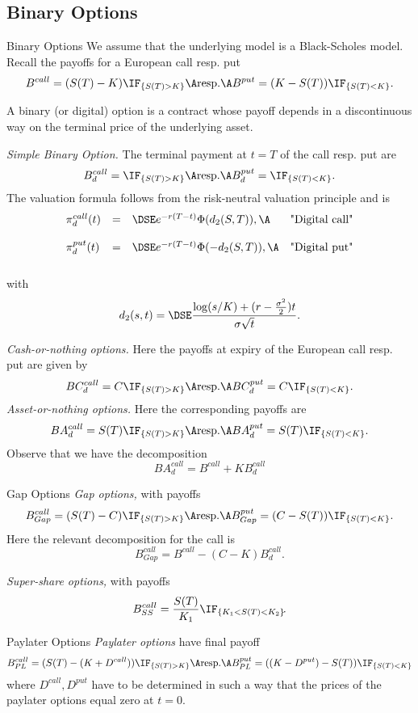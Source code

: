 \subsection{Binary Options}
Binary Options
	We assume that the underlying model is a  Black-Scholes model. Recall the payoffs for a European
	call resp. put
		$$
		B^{call} = (S(T)-K)\IF_{\{S(T) >K\}} \A \mbox{resp.} \A B^{put} = (K-S(T))\IF_{\{S(T)
		<K\}}.
		$$

		A binary (or digital) option is a contract whose
		payoff depends in a discontinuous way on the
		terminal price of the underlying asset.

		{\it Simple Binary Option.}
		The terminal payment at $t=T$ of the call resp. put are
			$$
			B_d^{call} = \IF_{\{S(T) >K\}} \A \mbox{resp.} \A B_d^{put} = \IF_{\{S(T)
			<K\}}.
			$$
		The valuation formula follows from the risk-neutral valuation principle
		and is
			$$
			\begin{array}{llll}
			\pi_d^{call}(t) &=&\DSE e^{-r(T-t)} \Phi(d_2(S, T)), \A &\mbox{"Digital call"}\\*[12pt]
			\pi_d^{put}(t) &=&\DSE e^{-r(T-t)} \Phi(-d_2(S, T)), \A &\mbox{"Digital put"}\\*[12pt]
			\end{array}
			$$
		with
			$$
			d_2(s,t) =\DSE
			\frac{\log(s/K) + (r -
			\frac{\sigma^2}{2})t}{\sigma \sqrt{t}}.
			$$

		{\it Cash-or-nothing options.}  Here the payoffs at
		expiry of the European call resp. put are given by
			$$
			BC_d^{call} = C \IF_{\{S(T) >K\}} \A \mbox{resp.} \A BC_d^{put} = C \IF_{\{S(T)
			<K\}}.
			$$
		{\it Asset-or-nothing options.}  Here the corresponding payoffs are
			$$
			BA_d^{call} = S(T) \IF_{\{S(T) >K\}} \A \mbox{resp.} \A BA_d^{put} = S(T) \IF_{\{S(T)
			<K\}}.
			$$
			Observe that we have the decomposition
			$$
			BA_d^{call} = B^{call}+K B_d^{call}
			$$


Gap Options
{\it Gap options,} with payoffs
	$$
	B_{Gap}^{call} = (S(T)-C)\IF_{\{S(T) >K\}} \A \mbox{resp.} \A B_{Gap}^{put} = (C-S(T))\IF_{\{S(T)
	<K\}}.
	$$
Here the relevant decomposition for the call is
	$$
	B_{Gap}^{call}= B^{call}-(C-K)B_d^{call}.
	$$

{\it Super-share options,} with payoffs
	$$
	B_{SS}^{call} = \frac{S(T)}{K_1} \IF_{\{K_1 < S(T) <K_2\}}\!.
	$$


Paylater Options
	{\it Paylater options} have final payoff
		$$
		B_{PL}^{call} = (S(T)-(K+D^{call}))\IF_{\{S(T) >K\}} \A \mbox{resp.} \A B_{PL}^{put} = ((K-D^{put})-S(T))\IF_{\{S(T)
		<K\}}
		$$
	where $D^{call}, D^{put}$ have to be determined in such a way that the prices of the paylater
	options equal zero at $t=0$.

